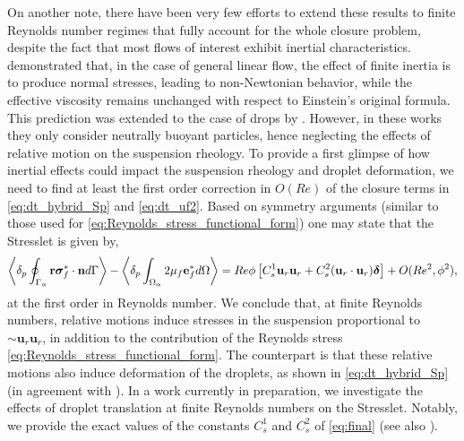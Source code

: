 On another note, there have been very few efforts to extend these results to finite Reynolds number regimes that fully account for the whole closure problem, despite the fact that most flows of interest exhibit inertial characteristics. 
\citet{stone2001inertial} demonstrated that, in the case of general linear flow, the effect of finite inertia is to produce normal stresses, leading to non-Newtonian behavior, while the effective viscosity remains unchanged with respect to Einstein's original formula. 
This prediction was extended to the case of drops by \citet{raja2010inertial}. 
However, in these works they only consider neutrally buoyant particles, hence neglecting the effects of relative motion on the suspension rheology. 
To provide a first glimpse of how inertial effects could impact the suspension rheology and droplet deformation, we need to find at least the first order correction in $O(Re)$ of the closure terms in \ref{eq:dt_hybrid_Sp} and \ref{eq:dt_uf2}. 
Based on symmetry arguments (similar to those used for \ref{eq:Reynolds_stress_functional_form}) one may state that the Stresslet is given by, 
\begin{equation}
    \pSavg{\textbf{r}\bm\sigma^*_f\cdot \textbf{n}}
    -\pOavg{2\mu_f\textbf{e}^*_f}
    =
    Re \phi 
    \left[
       C_s^1 \textbf{u}_{r}\textbf{u}_{r} 
    +  C_s^2 (\textbf{u}_{r}\cdot \textbf{u}_{r})\bm\delta
    \right]
    + O(Re^2,\phi^2),
    \label{eq:final}
\end{equation}
at the first order in Reynolds number. 
We conclude that, at finite Reynolds numbers, relative motions induce stresses in the suspension proportional to $\sim \textbf{u}_r\textbf{u}_r$, in addition to the contribution of the Reynolds stress \eqref{eq:Reynolds_stress_functional_form}. 
The counterpart is that these relative motions also induce deformation of the droplets, as shown in \eqref{eq:dt_hybrid_Sp} (in agreement with \citet{taylor1964deformation}).
In a work currently in preparation, we investigate the effects of droplet translation at finite Reynolds numbers on the Stresslet. 
Notably, we provide the exact values of the constants $C_s^{1}$ and $C_s^{2}$ of \ref{eq:final} (see also \citet{fintzi2025}). 
 

